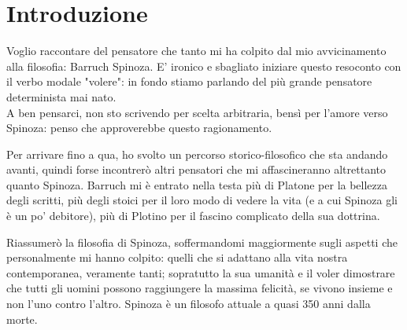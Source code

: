 
\chapter*{Introduzione}

Voglio raccontare del pensatore che tanto mi ha colpito dal mio avvicinamento alla filosofia: Barruch Spinoza. E' ironico e sbagliato iniziare questo resoconto con il verbo modale "volere": in fondo stiamo parlando del più grande pensatore determinista mai nato.\\
A ben pensarci, non sto scrivendo per scelta arbitraria, bensì per l'amore verso Spinoza: penso che approverebbe questo ragionamento.

Per arrivare fino a qua, ho svolto un percorso storico-filosofico che sta andando avanti, quindi forse incontrerò  altri pensatori che mi affascineranno altrettanto quanto Spinoza. Barruch mi è entrato nella testa più di Platone per la bellezza degli scritti, più degli stoici per il loro modo di vedere la vita (e a cui Spinoza gli è un po' debitore), più di Plotino per il fascino complicato della sua dottrina.

Riassumerò la filosofia di Spinoza, soffermandomi maggiormente sugli aspetti che  personalmente mi hanno colpito: quelli che si adattano alla vita nostra contemporanea, veramente tanti; sopratutto la sua umanità e il voler dimostrare che tutti gli uomini possono raggiungere la massima felicità, se vivono insieme e non l'uno contro l'altro. Spinoza è un filosofo attuale a quasi 350 anni dalla morte.
\newpage
